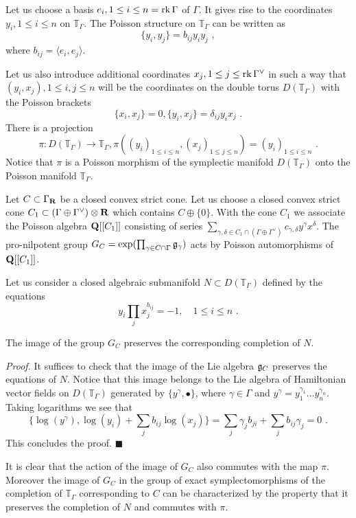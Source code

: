\documentclass[12pt]{article}
\begin{document}
Let us choose a basis $e_i, 1\le i\le n=\operatorname{rk}\Gamma$ of $\Gamma$. It gives rise to the coordinates $y_i, 1\le i\le n$ on ${\mathbb T}_{\Gamma}$.
The Poisson structure on ${\mathbb T}_{\Gamma}$ can be written as
$$\{y_i,y_j\}=b_{ij}y_iy_j\,\,,$$
where $b_{ij}=\langle e_i,e_j \rangle$.

Let us also introduce additional coordinates $x_j, 1\le j\le \operatorname{rk}\Gamma^{\vee}$ in such a way that
$(y_i,x_j), 1\le i,j\le n$ will be the coordinates on the double torus $D({\mathbb T}_{\Gamma})$ with the Poisson brackets
$$\{x_i,x_j\}=0,\{y_i,x_j\}=\delta_{ij}y_i x_j\,\,.$$
There is a projection
$$\pi:D({\mathbb T}_{\Gamma})\to {\mathbb T}_{\Gamma}, \pi((y_i)_{1\le i\le n},(x_j)_{1\le j\le n})=(y_i)_{1\le i\le n}\,\,.$$
Notice that  $\pi$ is a Poisson morphism of the symplectic manifold
$D({\mathbb T}_{\Gamma})$ onto the Poisson manifold ${\mathbb T}_{\Gamma}$.

Let $C\subset \Gamma_{{\bf R}}$ be a closed convex strict cone.
Let us choose
a closed convex strict cone $C_1\subset (\Gamma\oplus\Gamma^{\vee})\otimes {{\bf R}}$ which contains $C\oplus\{0\}$.
With the cone $C_1$ we associate the Poisson algebra ${\bf Q}[[C_1]]$ consisting of series
$\sum_{\gamma,\delta\in C_1\cap (\Gamma\oplus\Gamma^{\vee})}c_{\gamma,\delta}y^{\gamma}x^{\delta}$. The pro-nilpotent group $G_C=\exp(\prod_{\gamma\in C\cap \Gamma}{\mathfrak g}_{\gamma})$ acts by Poisson automorphisms
of ${\bf Q}[[C_1]]$.


Let us consider a closed algebraic submanifold $N\subset D({\mathbb T}_{\Gamma})$ defined by the equations
$$y_i\prod_jx_j^{b_{ij}}=-1, \,\,\,\,\,\,1\le i\le n\,\,.$$

\begin{lmm} The image of the group $G_C$ preserves the corresponding completion of $N$.

\end{lmm}

{\it Proof.} It suffices to check that the image of the Lie algebra ${\mathfrak g}_{C}$ preserves the equations
of $N$. Notice that this image belongs to the Lie algebra of Hamiltonian vector fields
on $D({\mathbb T}_{\Gamma})$ generated by $\{y^{\gamma},\bullet\}$, where $\gamma\in \Gamma$ and
$y^{\gamma}=y_1^{\gamma_1}\dots y_n^{\gamma_n}$. Taking logarithms we see that
$$\{\log(y^{\gamma}),\log(y_i)+\sum_j b_{ij}\log(x_j)\}=\sum_j\gamma_j b_{ji}+\sum_j b_{ij}\gamma_j=0\,\,.$$
This concludes the proof. $\blacksquare$



\begin{rmk} It is clear that the action of the image of $G_{C}$ also commutes with the map $\pi$.
Moreover the image of $G_C$ in the group of exact symplectomorphisms of the completion of ${\mathbb T}_{\Gamma}$ corresponding to $C$ can be  characterized by the property that it preserves the completion of
$N$ and commutes with $\pi$.



\end{rmk}
\end{document}
